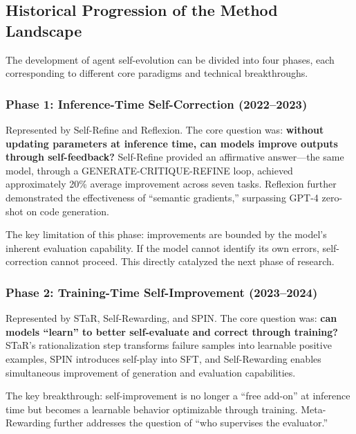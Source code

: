 \subsection{Historical Progression of the Method Landscape}\label{sec:ch3-history}

The development of agent self-evolution can be divided into four phases, each corresponding to different core paradigms and technical breakthroughs.

\subsubsection{Phase 1: Inference-Time Self-Correction (2022--2023)}

Represented by Self-Refine and Reflexion. The core question was: \textbf{without updating parameters at inference time, can models improve outputs through self-feedback?} Self-Refine provided an affirmative answer---the same model, through a GENERATE-CRITIQUE-REFINE loop, achieved approximately 20\% average improvement across seven tasks. Reflexion further demonstrated the effectiveness of ``semantic gradients,'' surpassing GPT-4 zero-shot on code generation.

The key limitation of this phase: improvements are bounded by the model's inherent evaluation capability. If the model cannot identify its own errors, self-correction cannot proceed. This directly catalyzed the next phase of research.

\subsubsection{Phase 2: Training-Time Self-Improvement (2023--2024)}

Represented by STaR, Self-Rewarding, and SPIN. The core question was: \textbf{can models ``learn'' to better self-evaluate and correct through training?} STaR's rationalization step transforms failure samples into learnable positive examples, SPIN introduces self-play into SFT, and Self-Rewarding enables simultaneous improvement of generation and evaluation capabilities.

The key breakthrough: self-improvement is no longer a ``free add-on'' at inference time but becomes a learnable behavior optimizable through training. Meta-Rewarding further addresses the question of ``who supervises the evaluator.''

